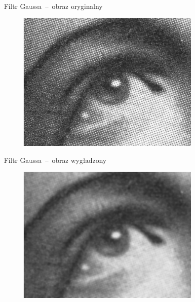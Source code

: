 \documentclass[xcolor=dvipsnames]{beamer}
\begin{document}
\begin{frame}{Filtr Gaussa~--~obraz oryginalny}
    \begin{figure}
        \includegraphics[width=0.8\textwidth]{img/gauss-conv-real-input.jpg}
    \end{figure}
\end{frame}
\begin{frame}{Filtr Gaussa~--~obraz wygładzony}
    \begin{figure}
        \includegraphics[width=0.8\textwidth]{img/gauss-conv-real-output.jpg}
    \end{figure}
\end{frame}
\end{document}

